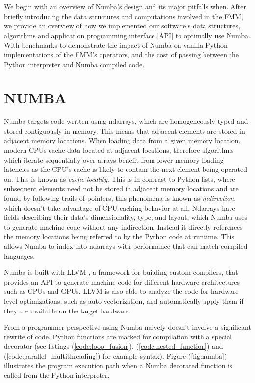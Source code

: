\documentclass{IEEEcsmag}
\begin{document}
We begin with an overview of Numba's design and its major pitfalls when. After briefly introducing the data structures and computations involved in the FMM, we provide an overview of how we implemented our software's data structures, algorithms and application programming interface [API] to optimally use Numba. With benchmarks to demonstrate the impact of Numba on vanilla Python implementations of the FMM's operators, and the cost of passing between the Python interpreter and Numba compiled code.

\section{NUMBA}

Numba targets code written using ndarrays, which are homogeneously typed and stored contiguously in memory. This means that adjacent elements are stored in adjacent memory locations. When loading data from a given memory location, modern CPUs cache data located at adjacent locations, therefore algorithms which iterate sequentially over arrays benefit from lower memory loading latencies as the CPU's cache is likely to contain the next element being operated on. This is known as \textit{cache locality}. This is in contrast to Python lists, where subsequent elements need not be stored in adjacent memory locations and are found by following trails of pointers, this phenomena is known as \textit{indirection}, which doesn't take advantage of CPU caching behavior at all. Ndarrays have fields describing their data's dimensionality, type, and layout, which Numba uses to generate machine code without any indirection. Instead it directly references the memory locations being referred to by the Python code at runtime. This allows Numba to index into ndarrays with performance that can match compiled languages.

Numba is built with LLVM \cite{Lattner2004}, a framework for building custom compilers, that provides an API to generate machine code for different hardware architectures such as CPUs and GPUs. LLVM is also able to analyze the code for hardware level optimizations, such as auto vectorization, and automatically apply them if they are available on the target hardware.

From a programmer perspective using Numba naively doesn't involve a significant rewrite of code. Python functions are marked for compilation with a special decorator (see listings (\ref{code:loop_fusion}), (\ref{code:nested_function}) and (\ref{code:parallel_multithreading}) for example syntax). Figure (\ref{fig:numba}) illustrates the program execution path when a Numba decorated function is called from the Python interpreter.
\end{document}
